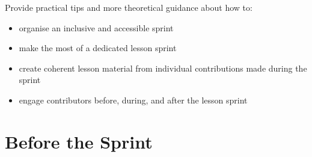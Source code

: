 \documentclass[
]{book}
\providecommand{\tightlist}{%
  \setlength{\itemsep}{0pt}\setlength{\parskip}{0pt}}
\begin{document}
Provide practical tips and more theoretical guidance about how to:

\begin{itemize}
\tightlist
\item
  organise an inclusive and accessible sprint
\item
  make the most of a dedicated lesson sprint
\item
  create coherent lesson material from individual contributions made during the sprint
\item
  engage contributors before, during, and after the lesson sprint
\end{itemize}

\hypertarget{before-the-sprint}{%
\section{Before the Sprint}\label{before-the-sprint}}
\end{document}
